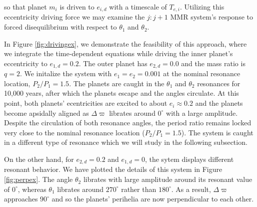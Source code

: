 \documentclass[usenatbib,onecolumn]{mnras}
\begin{document}
\noindent so that planet \(m_i\) is driven to \(e_{i,d}\) with a
timescale of \(T_{e,i}\).  Utilizing this eccentricity driving force we
may examine the \(j:j+1\) MMR system's response to forced disequilibrium
with respect to \(\theta_1\) and \(\theta_2\).

In Figure \ref{fig:drivingex}, we demonstrate the feasibility of this
approach, where we integrate the time-dependent equations while
driving the inner planet's eccentricity to \(e_{1,d}=0.2\).  The outer
planet has \(e_{2,d}=0.0\) and the mass ratio is \(q=2\).  We initalize
the system with \(e_{1}=e_2=0.001\) at the nominal resonance location,
\(P_{2}/P_1 = 1.5\). The planets are caught in the \(\theta_1\) and
\(\theta_2\) resonances for 10,000 years, after which the planets escape
and the angles circulate. At this point, both planets' ecentricities
are excited to about \(e_i\approx 0.2\) and the planets become apsidally
aligned as \(\Delta\varpi\) librates around \(0^\circ\) with a large
amplitude.  Despite the circulation of both resonance angles, the
period ratio remains locked very close to the nominal resonance
location (\(P_2/P_1= 1.5\)). The system is caught in a different type of
resonance which we will study in the following subsection.

On the other hand, for \(e_{2,d}=0.2\) and \(e_{1,d}=0\), the sytem
displays different resonant behavior.  We have plotted the details of
this system in Figure \ref{fig:perpex}. The angle \(\theta_2\) librates
with large amplitude around its resonant value of \(0^\circ\), whereas
\(\theta_1\) librates around \(270^\circ\) rather than \(180^\circ\).  As a
result, \(\Delta\varpi\) approaches \(90^\circ\) and so the planets'
perihelia are now perpendicular to each other.
\end{document}
